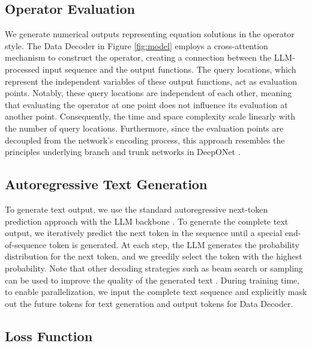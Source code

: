 \documentclass{article}
\begin{document}
\subsection{Operator Evaluation}
We generate numerical outputs representing equation solutions in the operator style. The Data Decoder in Figure \ref{fig:model} employs a cross-attention mechanism to construct the operator, creating a connection between the LLM-processed input sequence and the output functions. The query locations, which represent the independent variables of these output functions, act as evaluation points. Notably, these query locations are independent of each other, meaning that evaluating the operator at one point does not influence its evaluation at another point. Consequently, the time and space complexity scale linearly with the number of query locations. Furthermore, since the evaluation points are decoupled from the network's encoding process, this approach resembles the principles underlying branch and trunk networks in DeepONet \cite{lu2019deeponet}.

\subsection{Autoregressive Text Generation}
To generate text output, we use the standard autoregressive next-token prediction approach with the LLM backbone \cite{vaswani2017attention}. To generate the complete text output, we iteratively predict the next token in the sequence until a special end-of-sequence token is generated. At each step, the LLM generates the probability distribution for the next token, and we greedily select the token with the highest probability. Note that other decoding strategies such as beam search or sampling can be used to improve the quality of the generated text \cite{kulikov2018importance, ott2018analyzing}. During training time, to enable parallelization, we input the complete text sequence and explicitly mask out the future tokens for text generation and output tokens for Data Decoder. 

\subsection{Loss Function}
\end{document}
